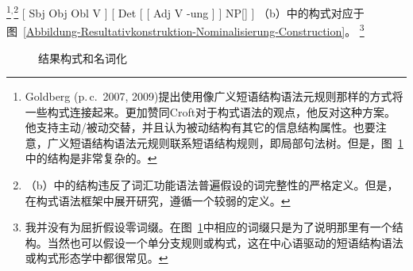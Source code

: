 \footnote{%
  Goldberg (p.\,c.\ 2007, 2009)提出使用像广义短语结构语法元规则那样的方式将一些构式连接起来。\citet[]{Deppermann2006a}更加赞同Croft对于构式语法的观点，他反对这种方案。他支持主动/被动交替，并且认为被动结构有其它的信息结构属性。也要注意，广义短语结构语法元规则联系短语结构规则，即局部句法树。但是，图~\ref{Abbildung-Resultativkonstruktion-Nominalisierung-Construction}中的结构是非常复杂的。
}$^,$\footnote{%
（b）中的结构违反了词汇功能语法\indexlfgc 普遍假设的词完整性的严格定义。但是，\citet{Booij2005a,Booij2009a}在构式语法\indexcxgc 框架中展开研究，遵循一个较弱的定义。
}
\eal
\ex {}[ Sbj Obj Obl V ]
\ex {}[ Det [ [ Adj V -ung ] ] NP[] ]
\zl
（b）中的构式对应于图~\vref{Abbildung-Resultativkonstruktion-Nominalisierung-Construction}。
\footnote{%
  我并没有为屈折假设零词缀。在图~\ref{Abbildung-Resultativkonstruktion-Nominalisierung-Construction}中相应的词缀只是为了说明那里有一个结构。当然也可以假设一个单分支规则或构式，这在中心语驱动的短语结构语法或构式形态学中都很常见。
}
\begin{figure}
\centering
{}
\caption{\label{Abbildung-Resultativkonstruktion-Nominalisierung-Construction}结果构式和名词化}
\end{figure}%
